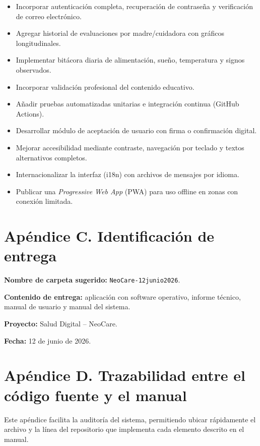 \documentclass[12pt,letterpaper]{article}
\begin{document}
\begin{itemize}
    \item Incorporar autenticación completa, recuperación de contraseña y verificación de correo electrónico.
    \item Agregar historial de evaluaciones por madre/cuidadora con gráficos longitudinales.
    \item Implementar bitácora diaria de alimentación, sueño, temperatura y signos observados.
    \item Incorporar validación profesional del contenido educativo.
    \item Añadir pruebas automatizadas unitarias e integración continua (GitHub Actions).
    \item Desarrollar módulo de aceptación de usuario con firma o confirmación digital.
    \item Mejorar accesibilidad mediante contraste, navegación por teclado y textos alternativos completos.
    \item Internacionalizar la interfaz (i18n) con archivos de mensajes por idioma.
    \item Publicar una \textit{Progressive Web App} (PWA) para uso offline en zonas con conexión limitada.
\end{itemize}

\section{Apéndice C. Identificación de entrega}

\textbf{Nombre de carpeta sugerido:} \texttt{NeoCare-12junio2026}.\par
\textbf{Contenido de entrega:} aplicación con software operativo, informe técnico, manual de usuario y manual del sistema.\par
\textbf{Proyecto:} Salud Digital -- NeoCare.\par
\textbf{Fecha:} 12 de junio de 2026.

\section{Apéndice D. Trazabilidad entre el código fuente y el manual}

Este apéndice facilita la auditoría del sistema, permitiendo ubicar rápidamente el archivo y la línea del repositorio que implementa cada elemento descrito en el manual.
\end{document}
